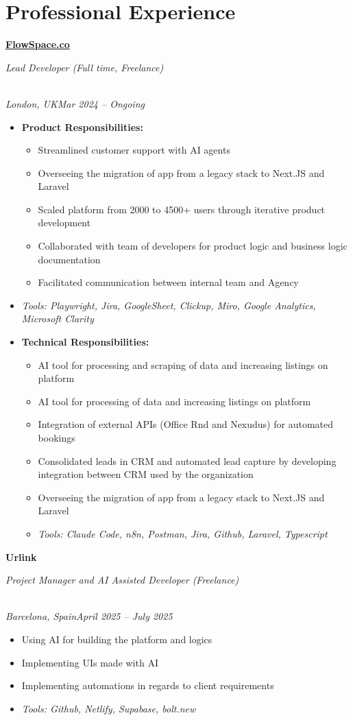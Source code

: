 \documentclass[a4paper,10pt]{article}
\newcommand{\role}[4]{\vspace{3pt}\noindent\hspace{0.6em}\parbox[t]{0.38\textwidth}{\raggedright\textbf{#1}}\hfill\parbox[t]{0.58\textwidth}{\raggedleft\textit{#2}}\\{\textit{#3}\hfill\textit{#4}}\vspace{1pt}}
\begin{document}
\section{Professional Experience}
\role{\href{https://flowspace.co}{FlowSpace.co}}{Lead Developer (Full time, Freelance)}{London, UK}{Mar 2024 -- Ongoing}
\begin{itemize}
\item \textbf{Product Responsibilities:}
\begin{itemize}[label=--]
\item Streamlined customer support with AI agents
\item Overseeing the migration of app from a legacy stack to Next.JS and Laravel
\item Scaled platform from 2000 to 4500+ users through iterative product development
\item Collaborated with team of developers for product logic and business logic documentation
\item Facilitated communication between internal team and Agency
\end{itemize}
\item \textit{Tools: Playwright, Jira, GoogleSheet, Clickup, Miro, Google Analytics, Microsoft Clarity}
\item \textbf{Technical Responsibilities:}
\begin{itemize}[label=--]
\item AI tool for processing and scraping of data and increasing listings on platform
\item AI tool for processing of data and increasing listings on platform
\item Integration of external APIs (Office Rnd and Nexudus) for automated bookings
\item Consolidated leads in CRM and automated lead capture by developing integration between CRM used by the organization
\item Overseeing the migration of app from a legacy stack to Next.JS and Laravel
\item \textit{Tools: Claude Code, n8n, Postman, Jira, Github, Laravel, Typescript}
\end{itemize}
\end{itemize}

\role{Urlink}{Project Manager and AI Assisted Developer (Freelance)}{Barcelona, Spain}{April 2025 -- July 2025}
\begin{itemize}
\item Using AI for building the platform and logics
\item Implementing UIs made with AI
\item Implementing automations in regards to client requirements
\item \textit{Tools: Github, Netlify, Supabase, bolt.new}
\end{itemize}
\end{document}

